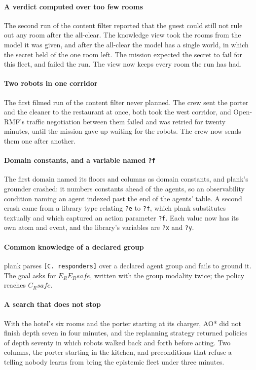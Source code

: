 \documentclass[11pt,a4paper]{article}
\theoremstyle{definition}
\newcommand{\code}[1]{\texttt{\small #1}}
\newcommand{\safe}{\mathit{safe}}
\begin{document}
\paragraph{A verdict computed over too few rooms}
The second run of the content filter reported that the guest could still not
rule out any room after the all-clear. The knowledge view took the rooms from the
model it was given, and after the all-clear the model has a single world, in
which the secret held of the one room left. The mission expected the secret to
fail for this fleet, and failed the run. The view now keeps every room the run
has had.

\paragraph{Two robots in one corridor}
The first filmed run of the content filter never planned. The crew sent the
porter and the cleaner to the restaurant at once, both took the west corridor,
and Open-RMF's traffic negotiation between them failed and was retried for
twenty minutes, until the mission gave up waiting for the robots. The crew now
sends them one after another.

\paragraph{Domain constants, and a variable named \code{?f}}
The first domain named its floors and columns as domain constants, and plank's
grounder crashed: it numbers constants ahead of the agents, so an observability
condition naming an agent indexed past the end of the agents' table. A second
crash came from a library type relating \code{?e} to \code{?f}, which plank
substitutes textually and which captured an action parameter \code{?f}. Each
value now has its own atom and event, and the library's variables are \code{?x}
and \code{?y}.

\paragraph{Common knowledge of a declared group}
plank parses \code{[C.\ responders]} over a declared agent group and fails to
ground it. The goal asks for $E_RE_R\safe$, written with the group modality
twice; the policy reaches $C_R\safe$.

\paragraph{A search that does not stop}
With the hotel's six rooms and the porter starting at its charger, AO* did not
finish depth seven in four minutes, and the replanning strategy returned policies
of depth seventy in which robots walked back and forth before acting. Two columns,
the porter starting in the kitchen, and preconditions that refuse a telling
nobody learns from bring the epistemic fleet under three minutes.
\end{document}
